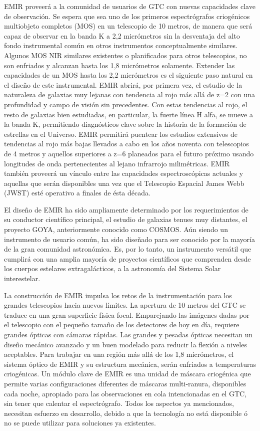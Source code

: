 EMIR proveerá a la comunidad de usuarios de GTC con nuevas capacidades clave de
observación. Se espera que sea uno de los primeros espectrógrafos criogénicos
multiobjeto completos (MOS) en un telescopio de 10 metros, de manera que será
capaz de observar en la banda K a 2,2 micrómetros sin la desventaja del alto
fondo instrumental común en otros instrumentos conceptualmente similares.
Algunos MOS NIR similares existentes o planificados para otros telescopios, no
son enfriados y alcanzan hasta los 1,8 micrómetros solamente. Extender las
capacidades de un MOS hasta los 2,2 micrómetros es el siguiente paso natural en
el diseño de este instrumental. EMIR abrirá, por primera vez, el estudio de la
naturaleza de galaxias muy lejanas con tendencia al rojo más allá de z=2 con
una profundidad y campo de visión sin precedentes. Con estas tendencias al rojo,
el resto de galaxias bien estudiadas, en particular, la fuerte línea H alfa, se
mueve a la banda K, permitiendo diagnósticos clave sobre la historia de la
formación de estrellas en el Universo. EMIR permitirá puentear los estudios
extensivos de tendencias al rojo más bajas llevados a cabo en los años noventa
con telescopios de 4 metros y aquellos superiores a z=6 planeados para el futuro
próximo usando longitudes de onda pertenecientes al lejano infrarrojo
milimétricas. EMIR también proveerá un vínculo entre las capacidades
espectroscópicas actuales y aquellas que serán disponibles una vez que el
Telescopio Espacial James Webb (JWST) esté operativo a finales de ésta década.

El diseño de EMIR ha sido ampliamente determinado por los requerimientos de su
conductor científico principal, el estudio de galaxias tenues muy distantes, el
proyecto GOYA, anteriormente conocido como COSMOS. Aún siendo un instrumento de
usuario común, ha sido diseñado para ser conocido por la mayoría de la gran
comunidad astronómica. Es, por lo tanto, un instrumento versátil que cumplirá
con una amplia mayoría de proyectos científicos que comprenden desde los cuerpos
estelares extragalácticos, a la astronomía del Sistema Solar interestelar.

La construcción de EMIR impulsa los retos de la instrumentación para los grandes
telescopios hacia nuevos límites. La apertura de 10 metros del GTC se traduce en
una gran superficie física focal.  Emparejando las imágenes dadas por el
telescopio con el pequeño tamaño de los detectores de hoy en día, requiere
grandes ópticas con cámaras rápidas. Las grandes y pesadas ópticas necesitan un
diseño mecánico avanzado y un buen modelado para reducir la flexión a niveles
aceptables. Para trabajar en una región más allá de los 1,8 micrómetros, el
sistema óptico de EMIR y su estructura mecánica, serán enfriados a temperaturas
criogénicas. Un módulo clave de EMIR es una unidad de máscara criogénica que
permite varias configuraciones diferentes de máscaras multi-ranura, disponibles
cada noche, apropiado para las observaciones en cola intencionadas en el GTC,
sin tener que calentar el espectrógrafo. Todos los aspectos ya mencionados,
necesitan esfuerzo en desarrollo, debido a que la tecnología no está disponible
ó no se puede utilizar para soluciones ya existentes. 

